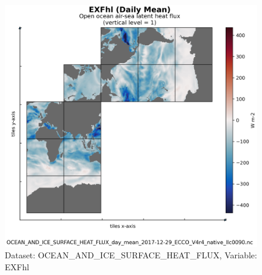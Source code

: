 \begin{figure}[H]
\centering
\includegraphics[scale=0.55]{../images/plots/native_plots/Ocean_and_Sea-Ice_Surface_Heat_Fluxes/EXFhl.png}
\caption{Dataset: OCEAN\_AND\_ICE\_SURFACE\_HEAT\_FLUX, Variable: EXFhl}
\label{tab:table-OCEAN_AND_ICE_SURFACE_HEAT_FLUX_EXFhl-Plot}
\end{figure}
\newpage
\pagebreak
